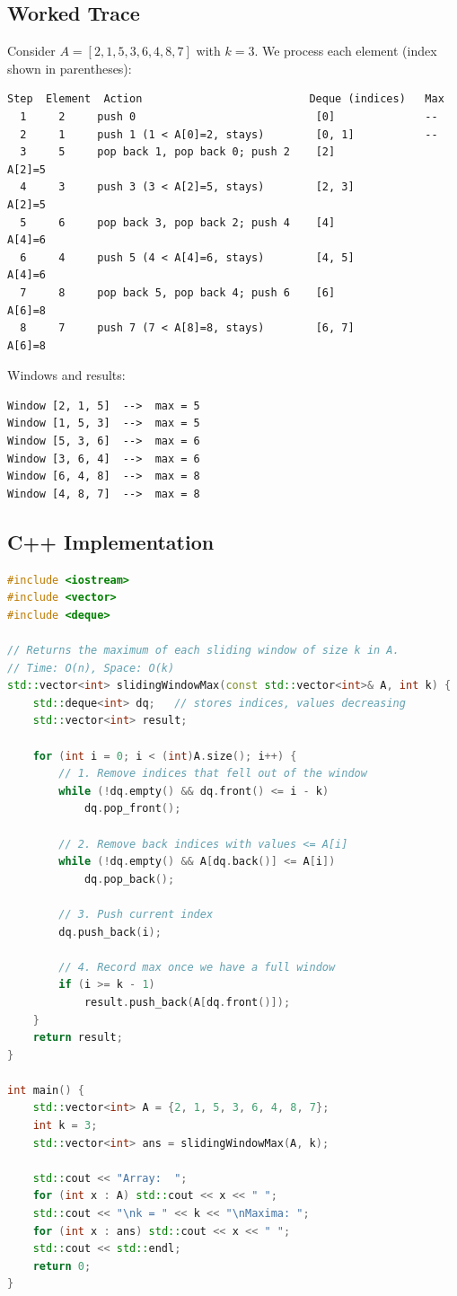 \subsection{Worked Trace}

Consider $A = [2, 1, 5, 3, 6, 4, 8, 7]$ with $k = 3$. We process each element (index shown in parentheses):

\begin{verbatim}
Step  Element  Action                          Deque (indices)   Max
  1     2     push 0                            [0]              --
  2     1     push 1 (1 < A[0]=2, stays)        [0, 1]           --
  3     5     pop back 1, pop back 0; push 2    [2]              A[2]=5
  4     3     push 3 (3 < A[2]=5, stays)        [2, 3]           A[2]=5
  5     6     pop back 3, pop back 2; push 4    [4]              A[4]=6
  6     4     push 5 (4 < A[4]=6, stays)        [4, 5]           A[4]=6
  7     8     pop back 5, pop back 4; push 6    [6]              A[6]=8
  8     7     push 7 (7 < A[8]=8, stays)        [6, 7]           A[6]=8
\end{verbatim}

Windows and results:
\begin{verbatim}
Window [2, 1, 5]  -->  max = 5
Window [1, 5, 3]  -->  max = 5
Window [5, 3, 6]  -->  max = 6
Window [3, 6, 4]  -->  max = 6
Window [6, 4, 8]  -->  max = 8
Window [4, 8, 7]  -->  max = 8
\end{verbatim}

\subsection{C++ Implementation}

\begin{lstlisting}[language=C++]
#include <iostream>
#include <vector>
#include <deque>

// Returns the maximum of each sliding window of size k in A.
// Time: O(n), Space: O(k)
std::vector<int> slidingWindowMax(const std::vector<int>& A, int k) {
    std::deque<int> dq;   // stores indices, values decreasing
    std::vector<int> result;

    for (int i = 0; i < (int)A.size(); i++) {
        // 1. Remove indices that fell out of the window
        while (!dq.empty() && dq.front() <= i - k)
            dq.pop_front();

        // 2. Remove back indices with values <= A[i]
        while (!dq.empty() && A[dq.back()] <= A[i])
            dq.pop_back();

        // 3. Push current index
        dq.push_back(i);

        // 4. Record max once we have a full window
        if (i >= k - 1)
            result.push_back(A[dq.front()]);
    }
    return result;
}

int main() {
    std::vector<int> A = {2, 1, 5, 3, 6, 4, 8, 7};
    int k = 3;
    std::vector<int> ans = slidingWindowMax(A, k);

    std::cout << "Array:  ";
    for (int x : A) std::cout << x << " ";
    std::cout << "\nk = " << k << "\nMaxima: ";
    for (int x : ans) std::cout << x << " ";
    std::cout << std::endl;
    return 0;
}
\end{lstlisting}

